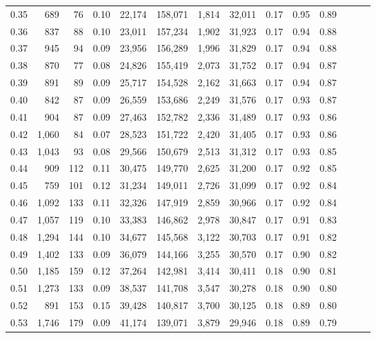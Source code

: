 \begin{tabular}{rrrrrrrrrrrrrr}
0.35 &    689 &     76 &  0.10 &   22,174 &  158,071 &   1,814 &  32,011 &  0.17 &  0.95 &      0.89 \\
0.36 &    837 &     88 &  0.10 &   23,011 &  157,234 &   1,902 &  31,923 &  0.17 &  0.94 &      0.88 \\
0.37 &    945 &     94 &  0.09 &   23,956 &  156,289 &   1,996 &  31,829 &  0.17 &  0.94 &      0.88 \\
0.38 &    870 &     77 &  0.08 &   24,826 &  155,419 &   2,073 &  31,752 &  0.17 &  0.94 &      0.87 \\
0.39 &    891 &     89 &  0.09 &   25,717 &  154,528 &   2,162 &  31,663 &  0.17 &  0.94 &      0.87 \\
0.40 &    842 &     87 &  0.09 &   26,559 &  153,686 &   2,249 &  31,576 &  0.17 &  0.93 &      0.87 \\
0.41 &    904 &     87 &  0.09 &   27,463 &  152,782 &   2,336 &  31,489 &  0.17 &  0.93 &      0.86 \\
0.42 &  1,060 &     84 &  0.07 &   28,523 &  151,722 &   2,420 &  31,405 &  0.17 &  0.93 &      0.86 \\
0.43 &  1,043 &     93 &  0.08 &   29,566 &  150,679 &   2,513 &  31,312 &  0.17 &  0.93 &      0.85 \\
0.44 &    909 &    112 &  0.11 &   30,475 &  149,770 &   2,625 &  31,200 &  0.17 &  0.92 &      0.85 \\
0.45 &    759 &    101 &  0.12 &   31,234 &  149,011 &   2,726 &  31,099 &  0.17 &  0.92 &      0.84 \\
0.46 &  1,092 &    133 &  0.11 &   32,326 &  147,919 &   2,859 &  30,966 &  0.17 &  0.92 &      0.84 \\
0.47 &  1,057 &    119 &  0.10 &   33,383 &  146,862 &   2,978 &  30,847 &  0.17 &  0.91 &      0.83 \\
0.48 &  1,294 &    144 &  0.10 &   34,677 &  145,568 &   3,122 &  30,703 &  0.17 &  0.91 &      0.82 \\
0.49 &  1,402 &    133 &  0.09 &   36,079 &  144,166 &   3,255 &  30,570 &  0.17 &  0.90 &      0.82 \\
0.50 &  1,185 &    159 &  0.12 &   37,264 &  142,981 &   3,414 &  30,411 &  0.18 &  0.90 &      0.81 \\
0.51 &  1,273 &    133 &  0.09 &   38,537 &  141,708 &   3,547 &  30,278 &  0.18 &  0.90 &      0.80 \\
0.52 &    891 &    153 &  0.15 &   39,428 &  140,817 &   3,700 &  30,125 &  0.18 &  0.89 &      0.80 \\
0.53 &  1,746 &    179 &  0.09 &   41,174 &  139,071 &   3,879 &  29,946 &  0.18 &  0.89 &      0.79 \\

\end{tabular}
